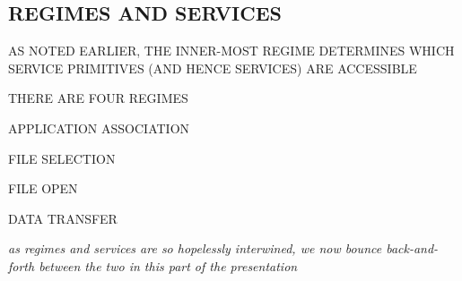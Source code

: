 \begin{bwslide}
\part*	{REGIMES AND SERVICES}\bf

\begin{nrtc}
\item	AS NOTED EARLIER,
	THE INNER-MOST REGIME DETERMINES WHICH SERVICE PRIMITIVES
	(AND HENCE SERVICES) ARE ACCESSIBLE

\item	THERE ARE FOUR REGIMES
    \begin{nrtc}
    \item	APPLICATION ASSOCIATION

    \item	FILE SELECTION

    \item	FILE OPEN

    \item	DATA TRANSFER
    \end{nrtc}
\end{nrtc}
\end{bwslide}




\begin{note}\em
as regimes and services are so hopelessly interwined,
we now bounce back-and-forth between the two in this part of the presentation
\end{note}


